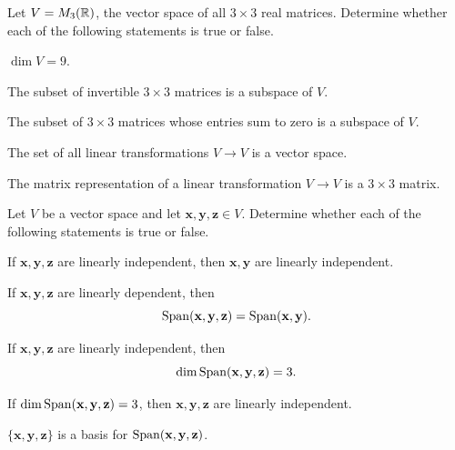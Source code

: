 \begin{problem}
Let $V=M_3(\mathbb{R})$, the vector space of all $3\times3$ real matrices. Determine whether each of the following statements is true or false.
\begin{problemchoices}
\item $\dim V=9$.
\item The subset of invertible $3\times3$ matrices is a subspace of $V$.
\item The subset of $3\times3$ matrices whose entries sum to zero is a subspace of $V$.
\item The set of all linear transformations $V\to V$ is a vector space.
\item The matrix representation of a linear transformation $V\to V$ is a $3\times3$ matrix.
\end{problemchoices}
\end{problem}

\begin{problem}
Let $V$ be a vector space and let $\mathbf x,\mathbf y,\mathbf z\in V$. Determine whether each of the following statements is true or false.
\begin{problemchoices}
\item If $\mathbf x,\mathbf y,\mathbf z$ are linearly independent, then $\mathbf x,\mathbf y$ are linearly independent.
\item If $\mathbf x,\mathbf y,\mathbf z$ are linearly dependent, then
\[
\operatorname{Span}(\mathbf x,\mathbf y,\mathbf z)=\operatorname{Span}(\mathbf x,\mathbf y).
\]
\item If $\mathbf x,\mathbf y,\mathbf z$ are linearly independent, then
\[
\dim\operatorname{Span}(\mathbf x,\mathbf y,\mathbf z)=3.
\]
\item If $\dim\operatorname{Span}(\mathbf x,\mathbf y,\mathbf z)=3$, then $\mathbf x,\mathbf y,\mathbf z$ are linearly independent.
\item $\{\mathbf x,\mathbf y,\mathbf z\}$ is a basis for $\operatorname{Span}(\mathbf x,\mathbf y,\mathbf z)$.
\end{problemchoices}
\end{problem}

